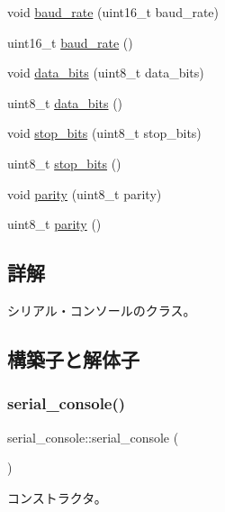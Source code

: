 \begin{DoxyCompactItemize}
void \hyperlink{classserial__console_a55aea672eefcfeadd7630531dc925613}{baud\+\_\+rate} (uint16\+\_\+t baud\+\_\+rate)
\item 
uint16\+\_\+t \hyperlink{classserial__console_ad090c8b90b07fc6ef25d816aa662b3a4}{baud\+\_\+rate} ()
\item 
void \hyperlink{classserial__console_acf0e666a73fcdbe99580e263a8c2c155}{data\+\_\+bits} (uint8\+\_\+t data\+\_\+bits)
\item 
uint8\+\_\+t \hyperlink{classserial__console_ac80a35d0277fe55a5fc1dd1b81d062c0}{data\+\_\+bits} ()
\item 
void \hyperlink{classserial__console_a556085cc185db329b9fb2c1637c17268}{stop\+\_\+bits} (uint8\+\_\+t stop\+\_\+bits)
\item 
uint8\+\_\+t \hyperlink{classserial__console_a43039f134f5b5b666b3a42a8fdad1484}{stop\+\_\+bits} ()
\item 
void \hyperlink{classserial__console_a8a6f476df2b731175674a571af2ad1bd}{parity} (uint8\+\_\+t parity)
\item 
uint8\+\_\+t \hyperlink{classserial__console_ad98e06cb51a6b41fbc4ee5e3b6cfd309}{parity} ()
\end{DoxyCompactItemize}


\subsection{詳解}
シリアル・コンソールのクラス。 

\subsection{構築子と解体子}
\hypertarget{classserial__console_a5cbd8276bd1ca301c3d148a141d3b72a}{}\label{classserial__console_a5cbd8276bd1ca301c3d148a141d3b72a} 
\subsubsection{\texorpdfstring{serial\+\_\+console()}{serial\_console()}\hspace{0.1cm}{\footnotesize\ttfamily [1/3]}}
{\footnotesize\ttfamily serial\+\_\+console\+::serial\+\_\+console (\begin{DoxyParamCaption}{ }\end{DoxyParamCaption})}

コンストラクタ。 \hypertarget{classserial__console_ad3a4f9f197191a6fa40f2098087d9ed3}{}\label{classserial__console_ad3a4f9f197191a6fa40f2098087d9ed3} 
